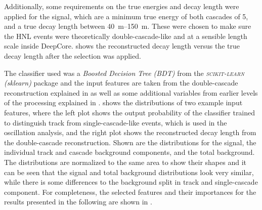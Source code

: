 Additionally, some requirements on the true energies and decay length were applied for the signal, which are a minimum true energy of both cascades of \SI{5}{\gev}, and a true decay length between \SIrange[range-phrase={~and~}]{40}{150}{\meter}. These were chosen to make sure the HNL events were theoretically double-cascade-like and at a sensible length scale inside DeepCore.  shows the reconstructed decay length versus the true decay length after the selection was applied.

The classifier used was a \textit{Boosted Decision Tree (BDT)} from the \textit{\textsc{scikit-learn} (sklearn)} package  and the input features are taken from the double-cascade reconstruction explained in  as well as some additional variables from earlier levels of the processing explained in .  shows the distributions of two example input features, where the left plot shows the output probability of the classifier trained to distinguish track from single-cascade-like events, which is used in the oscillation analysis, and the right plot shows the reconstructed decay length from the double-cascade reconstruction. Shown are the distributions for the signal, the individual track and cascade background components, and the total background. The distributions are normalized to the same area to show their shapes and it can be seen that the signal and total background distributions look very similar, while there is some differences to the background split in track and single-cascade component. For completeness, the selected features and their importances for the results presented in the following are shown in .

